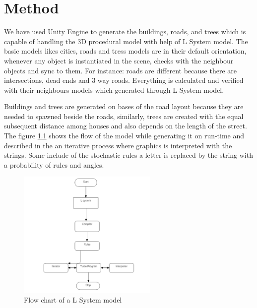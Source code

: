 \chapter{Method}

\large We have used Unity Engine to generate the buildings, roads, and trees which is capable of handling the 3D procedural model with help of L System model. The basic models likes cities, roads and tress models are in their default orientation, whenever any object is instantiated in the scene, checks with the neighbour objects and sync to them. For instance: roads are different because there are intersections, dead ends and 3 way roads. Everything is calculated and verified with their neighbours models which generated through L System model\cite{abrahamcity}.

\vspace{0.5cm}

\large Buildings and trees are generated on bases of the road layout because they are needed to spawned beside the roads, similarly, trees are created with the equal subsequent distance among houses and also depends on the length of the street. The figure \ref{fig:flowchart} shows the flow of the model while generating it on run-time and described in the \cite{abrahamcity} an iterative process where graphics is interpreted with the strings. Some include of the stochastic rules a letter is replaced by the string with a probability of rules and angles.   

\begin{figure}[h]
\caption{Flow chart of a L System model}
\label{fig:flowchart}
\vspace{0.3cm}
\centering
\includegraphics[width=0.6\textwidth]{3. method/Lsystem Flow Chart.png}
\end{figure}